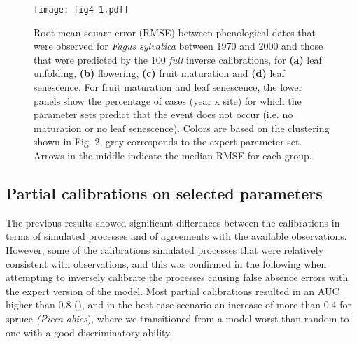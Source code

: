 \documentclass[letterpaper,8pt]{extarticle}  %
\begin{document}
\begin{doublespacing}
\begin{linenumbers}

\begin{figure}[htpb]
\hspace*{-1cm}
\centering
\begin{subcaptiongroup}
\label{fig:3A} 
\label{fig:3B}
\label{fig:3C}
\label{fig:3D}
\label{fig:3E}
\end{subcaptiongroup}
\texttt{[image: fig4-1.pdf]}
\caption{Root-mean-square error (RMSE) between phenological dates that were observed for \emph{Fagus sylvatica} between 1970 and 2000 and those that were predicted by the 100 \emph{full} inverse calibrations, for \textbf{(a)} leaf unfolding, \textbf{(b)} flowering, \textbf{(c)} fruit maturation and \textbf{(d)} leaf senescence. For fruit maturation and leaf senescence, the lower panels show the percentage of cases (year x site) for which the parameter sets predict that the event does not occur (i.e. no maturation or no leaf senescence). Colors are based on the clustering shown in Fig. 2, grey corresponds to the expert parameter set. Arrows in the middle indicate the median RMSE for each group.}
\label{fig:3}
\end{figure}

\subsection{Partial calibrations on selected parameters}

The previous results showed significant differences between the calibrations in terms of simulated processes and of agreements with the available observations. However, some of the calibrations simulated processes that were relatively consistent with observations, and this was confirmed in the following when attempting to inversely calibrate the processes causing false absence errors with the expert version of the model. Most partial calibrations resulted in an AUC higher than 0.8 (), and in the best-case scenario an increase of more than 0.4 for spruce \emph{(Picea abies}), where we transitioned from a model worst than random to one with a good discriminatory ability.


\end{linenumbers}
\end{doublespacing}
\end{document}

